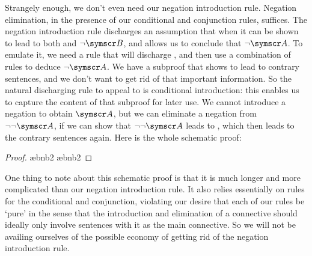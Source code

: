 Strangely enough, we don't even need our negation introduction rule. Negation elimination, in the presence of our conditional and conjunction rules, suffices. The negation introduction rule discharges an assumption that  when it can be shown to lead to both  and $\enot\meta{B}$, and allows us to conclude that $\enot\meta{A}$. To emulate it, we need a rule that will discharge , and then use a combination of rules to deduce $\enot\meta{A}$. We have a subproof that shows  to lead to contrary sentences, and we don't want to get rid of that important information. So the natural discharging rule to appeal to is conditional introduction: this enables us to capture the content of that subproof for later use. We cannot introduce a negation to obtain $\meta{A}$, but we can eliminate a negation from $\enot\enot\meta{A}$, if we can show that $\enot\enot\meta{A}$ leads to , which then leads to the contrary sentences again. Here is the whole schematic proof:
\begin{proof}
	\have[\ ]{}{\vdots}
	\open
	\have[\ ]{}{\vdots}
	\close
	\open
	\open
	\close
	\ae{bnb2}
	\ae{bnb2}
	\close
\end{proof}
One thing to note about this schematic proof is that it is much longer and more complicated than our negation introduction rule. It also relies essentially on rules for the conditional and conjunction, violating our desire that each of our rules be `pure' in the sense that the introduction and elimination of a connective should ideally only involve sentences with it as the main connective. So we will not be availing ourselves of the possible economy of getting rid of the negation introduction rule.

